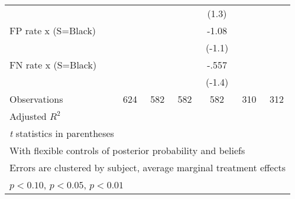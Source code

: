 \begin{table}[htbp]
\begin{tabular}{l*{6}{c}}
                &                  &                  &                  &    (1.3)         &                  &                  \\
FP rate x (S=Black)&                  &                  &                  &    -1.08         &                  &                  \\
                &                  &                  &                  &   (-1.1)         &                  &                  \\
FN rate x (S=Black)&                  &                  &                  &    -.557         &                  &                  \\
                &                  &                  &                  &   (-1.4)         &                  &                  \\
\hline
Observations    &      624         &      582         &      582         &      582         &      310         &      312         \\
Adjusted \(R^{2}\)&                  &                  &                  &                  &                  &                  \\
\hline\hline
\multicolumn{7}{l}{\footnotesize \textit{t} statistics in parentheses}\\
\multicolumn{7}{l}{\footnotesize With flexible controls of posterior probability and beliefs}\\
\multicolumn{7}{l}{\footnotesize Errors are clustered by subject, average marginal treatment effects}\\
\multicolumn{7}{l}{\footnotesize \sym{*} \(p<0.10\), \sym{**} \(p<0.05\), \sym{***} \(p<0.01\)}\\
\end{tabular}
\end{table}
